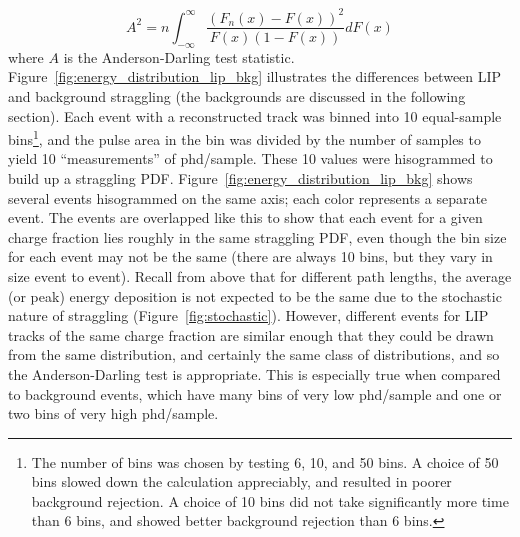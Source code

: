 \begin{equation}
A^{2} = n \int_{-\infty}^{\infty} \frac{ (F_{n}(x) - F(x))^{2}}{F(x)(1-F(x))} dF(x)
\end{equation}
where $A$ is the Anderson-Darling test statistic. Figure~\ref{fig:energy_distribution_lip_bkg} illustrates the differences between \ac{LIP} and background straggling (the backgrounds are discussed in the following section). Each event with a reconstructed track was binned into 10 equal-sample bins\footnote{The number of bins was chosen by testing 6, 10, and 50 bins. A choice of 50 bins slowed down the calculation appreciably, and resulted in poorer background rejection. A choice of 10 bins did not take significantly more time than 6 bins, and showed better background rejection than 6 bins.}, and the pulse area in the bin was divided by the number of samples to yield 10 ``measurements'' of phd/sample. These 10 values were hisogrammed to build up a straggling \ac{PDF}.  Figure~\ref{fig:energy_distribution_lip_bkg} shows several events hisogrammed on the same axis; each color represents a separate event. The events are overlapped like this to show that each event for a given charge fraction lies roughly in the same straggling \ac{PDF}, even though the bin size for each event may not be the same (there are always 10 bins, but they vary in size event to event). Recall from above that for different path lengths, the average (or peak) energy deposition is not expected to be the same due to the stochastic nature of straggling (Figure~\ref{fig:stochastic}). However, different events for \ac{LIP} tracks of the same charge fraction are similar enough that they could be drawn from the same distribution, and certainly the same class of distributions, and so the Anderson-Darling test is appropriate. This is especially true when compared to background events, which have many bins of very low phd/sample and one or two bins of very high phd/sample. 

